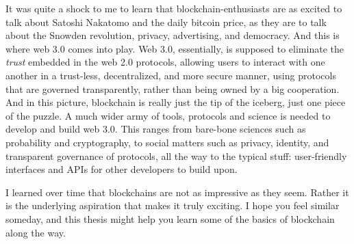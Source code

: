 It was quite a shock to me to learn that blockchain-enthusiasts are as excited to talk about Satoshi
Nakatomo and the daily bitcoin price, as they are to talk about the Snowden revolution, privacy,
advertising, and democracy. And this is where web 3.0 comes into play. Web 3.0, essentially, is
supposed to eliminate the \textit{trust} embedded in the web 2.0 protocols, allowing users to
interact with one another in a trust-less, decentralized, and more secure manner, using protocols
that are governed transparently, rather than being owned by a big cooperation. And in this picture,
blockchain is really just the tip of the iceberg, just one piece of the puzzle. A much wider army of
tools, protocols and science is needed to develop and build web 3.0. This ranges from bare-bone
sciences such as probability and cryptography, to social matters such as privacy, identity, and
transparent governance of protocols, all the way to the typical stuff: user-friendly interfaces and
APIs for other developers to build upon.

I learned over time that blockchains are not as impressive as they seem. Rather it is the underlying
aspiration that makes it truly exciting. I hope you feel similar someday, and this thesis might help
you learn some of the basics of blockchain along the way.
